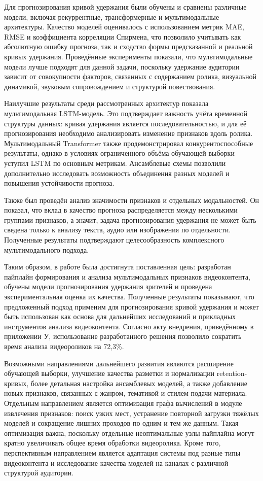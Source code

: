 \documentclass[times]{itmo-student-thesis}
\begin{document}
Для прогнозирования кривой удержания были обучены и сравнены различные модели, включая рекуррентные, трансформерные и мультимодальные архитектуры. Качество моделей оценивалось с использованием метрик MAE, RMSE и коэффициента корреляции Спирмена, что позволило учитывать как абсолютную ошибку прогноза, так и сходство формы предсказанной и реальной кривых удержания. Проведённые эксперименты показали, что мультимодальные модели лучше подходят для данной задачи, поскольку удержание аудитории зависит от совокупности факторов, связанных с содержанием ролика, визуальной динамикой, звуковым сопровождением и структурой повествования.

Наилучшие результаты среди рассмотренных архитектур показала мультимодальная LSTM-модель. Это подтверждает важность учёта временной структуры данных: кривая удержания является последовательностью, и для её прогнозирования необходимо анализировать изменение признаков вдоль ролика. Мультимодальный Transformer также продемонстрировал конкурентоспособные результаты, однако в условиях ограниченного объёма обучающей выборки уступил LSTM по основным метрикам. Ансамблевые схемы позволили дополнительно исследовать возможность объединения разных моделей и повышения устойчивости прогноза.

Также был проведён анализ значимости признаков и отдельных модальностей. Он показал, что вклад в качество прогноза распределяется между несколькими группами признаков, а значит, задача прогнозирования удержания не может быть сведена только к анализу текста, аудио или изображения по отдельности. Полученные результаты подтверждают целесообразность комплексного мультимодального подхода.

Таким образом, в работе была достигнута поставленная цель: разработан пайплайн формирования и анализа мультимодальных признаков видеоконтента, обучены модели прогнозирования удержания зрителей и проведена экспериментальная оценка их качества. Полученные результаты показывают, что предложенный подход применим для прогнозирования кривой удержания и может быть использован как основа для дальнейших исследований и прикладных инструментов анализа видеоконтента. Согласно акту внедрения, приведённому в приложении У, использование разработанного решения позволило сократить время анализа видеороликов на 72,3\%.

Возможными направлениями дальнейшего развития являются расширение обучающей выборки, улучшение качества разметки и нормализации retention-кривых, более детальная настройка ансамблевых моделей, а также добавление новых признаков, связанных с жанром, тематикой и стилем подачи материала. Отдельным направлением является оптимизация графа вычислений в модуле извлечения признаков: поиск узких мест, устранение повторной загрузки тяжёлых моделей и сокращение лишних проходов по одним и тем же данным. Такая оптимизация важна, поскольку отдельные неоптимальные узлы пайплайна могут кратно увеличивать общее время обработки видеоролика. Кроме того, перспективным направлением является адаптация системы под разные типы видеоконтента и исследование качества моделей на каналах с различной структурой аудитории.
\end{document}
